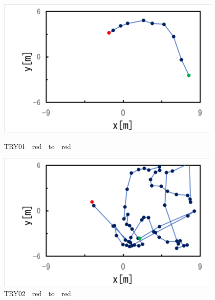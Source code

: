 \clearpage

\begin{figure}[ht]%
  \begin{center}
  
    \includegraphics[clip,width=15.0cm]{figure/TRY01_red_to_red.eps}
    \caption{TRY01　red　to　red}
    \label{fig:try01}
    
    \includegraphics[width=15.0cm]{figure/TRY02_red_to_red.eps}
    \caption{TRY02　red　to　red}
    \label{ig:try02}
    
  \end{center}
\end{figure}

